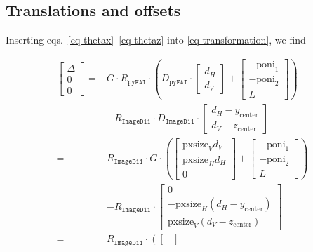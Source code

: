 \documentclass[12pt]{article}
\begin{document}
\subsection{Translations and offsets}

Inserting eqs.~\ref{eq-thetax}--\ref{eq-thetaz}
into \ref{eq-transformation}, we find

\begin{align}
  \begin{bmatrix} \Delta \\ 0 \\ 0 \end{bmatrix}
  = &
  G \cdot
  R_{\mathtt{pyFAI}}
  \cdot
  \left(
  D_{\mathtt{pyFAI}}
  \cdot
  \begin{bmatrix} d_H \\ d_V \end{bmatrix}
  +
  \begin{bmatrix} -\mathrm{poni}_1 \\ -\mathrm{poni}_2 \\ L \end{bmatrix}
  \right)
  \nonumber \\ &
  -
  R_{\mathtt{ImageD11}}
  \cdot
  D_{\mathtt{ImageD11}}
  \cdot
  \begin{bmatrix}
    d_H - y_{\mathrm{center}} \\
    d_V - z_{\mathrm{center}}
  \end{bmatrix}
  \\
  = &
  R_{\mathtt{ImageD11}}
  \cdot
  G \cdot
  \left(
  \begin{bmatrix}
    \mathrm{pxsize}_V d_V \\ \mathrm{pxsize}_H d_H \\ 0
  \end{bmatrix}
  +
  \begin{bmatrix} -\mathrm{poni}_1 \\ -\mathrm{poni}_2 \\ L \end{bmatrix}
  \right)
  \nonumber \\ &
  -
  R_{\mathtt{ImageD11}}
  \cdot
  \begin{bmatrix}
    0 \\
    -\mathrm{pxsize}_H (d_H - y_{\mathrm{center}}) \\
    \mathrm{pxsize}_V (d_V - z_{\mathrm{center}})
  \end{bmatrix}
  \\
  = &
  R_{\mathtt{ImageD11}}
  \cdot
  \left(
  \begin{bmatrix}

\end{bmatrix}
\end{align}
\end{document}
